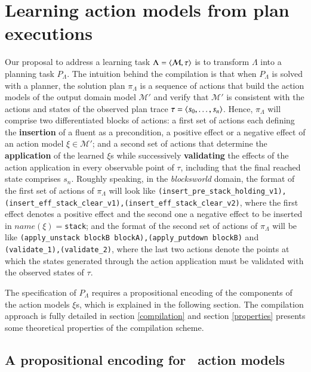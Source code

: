 
\section{Learning action models from plan executions}
\label{sec:learning}

\textcolor[rgb]{1.00,0.00,0.00}{Our proposal to address a learning task $\Lambda={\langle \mathcal{M},\tau \rangle}$ is to transform $\Lambda$ into a planning task $P_{\Lambda}$. The intuition behind the compilation is that when $P_{\Lambda}$ is solved with a planner, the solution plan $\pi_\Lambda$ is a sequence of actions that build the action models of the output domain model $\mathcal{M'}$ and verify that $\mathcal{M'}$ is consistent with the actions and states of the observed plan trace $\tau = {\langle s_0, \ldots, s_n \rangle}$. Hence, $\pi_\Lambda$ will comprise two differentiated blocks of actions: a first set of actions each defining the \textbf{insertion} of a fluent as a precondition, a positive effect or a negative effect of an action model $\xi \in \mathcal{M'}$; and a second set of actions that determine the \textbf{application} of the learned $\xi$s while successively \textbf{validating} the effects of the action application in every observable point of $\tau$, including that the final reached state comprises $s_n$. Roughly speaking, in the \emph{blocksworld} domain, the format of the first set of actions of $\pi_\Lambda$ will look like {\tt{\small (insert\_pre\_stack\_holding\_v1),(insert\_eff\_stack\_clear\_v1),(insert\_eff\_stack\_clear\_v2)}}, where the first effect denotes a positive effect and the second one a negative effect to be inserted in $name(\xi)=${\tt{\small stack}}; and the format of the second set of actions of $\pi_\Lambda$ will be like {\tt{\small (apply\_unstack blockB blockA),(apply\_putdown blockB)}} and {\tt{\small (validate\_1),(validate\_2)}}, where the last two actions denote the points at which the states generated through the action application must be validated with the observed states of $\tau$.}

\vspace{0.1cm}

The specification of $P_{\Lambda}$ requires a propositional encoding of the components of the action models $\xi$s, which is explained in the following section. The compilation approach is fully detailed in section \ref{compilation} and section \ref{properties} presents some theoretical properties of the compilation scheme.




\subsection{A propositional encoding for \strips\ action models}
\label{propositional_encoding}

